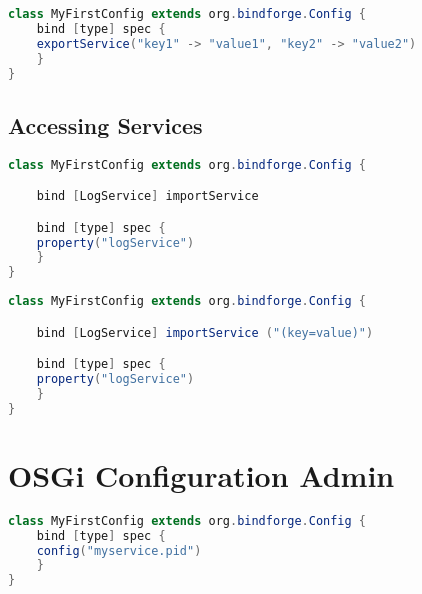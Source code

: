 \begin{lstlisting}[caption={Registering OSGi services with properties},label=registering_osgi_services_with_services,language=Java]
class MyFirstConfig extends org.bindforge.Config {
    bind [type] spec {
	exportService("key1" -> "value1", "key2" -> "value2")
    }
}
\end{lstlisting}


\subsection{Accessing Services}

\begin{lstlisting}[caption={Using OSGi services},label=using_osgi_services,language=Java]
class MyFirstConfig extends org.bindforge.Config {

    bind [LogService] importService

    bind [type] spec {
	property("logService")
    }
}
\end{lstlisting}

\begin{lstlisting}[caption={Using OSGi services and LDAP filters},label=using_osgi_services_and_ldap,language=Java]
class MyFirstConfig extends org.bindforge.Config {

    bind [LogService] importService ("(key=value)")

    bind [type] spec {
	property("logService")
    }
}
\end{lstlisting}



\section{OSGi Configuration Admin}

\begin{lstlisting}[caption={Using OSGi ConfigurationAdmin service},label=using_osgi_configurationadmin,language=Java]
class MyFirstConfig extends org.bindforge.Config {
    bind [type] spec {
	config("myservice.pid")
    }
}
\end{lstlisting}

